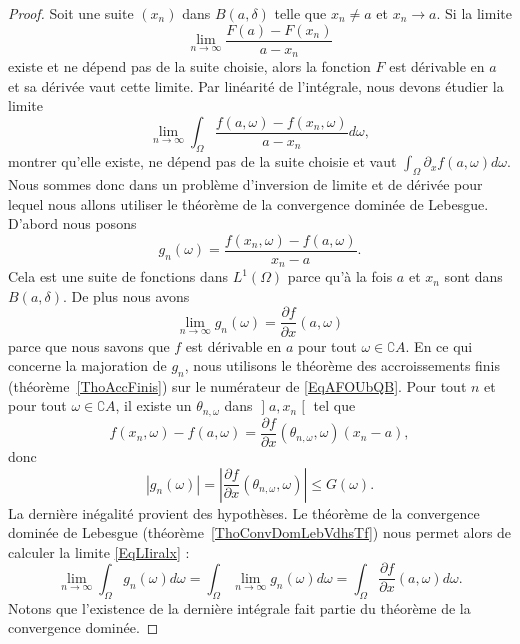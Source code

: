 \begin{proof}
    Soit une suite \( (x_n)\) dans \( B(a,\delta)\) telle que \( x_n\neq a\) et \( x_n\to a\). Si la limite
    \begin{equation}
        \lim_{n\to \infty} \frac{ F(a)-F(x_n) }{ a-x_n }
    \end{equation}
    existe et ne dépend pas de la suite choisie, alors la fonction \( F\) est dérivable en \( a\) et sa dérivée vaut cette limite. Par linéarité de l'intégrale, nous devons étudier la limite
    \begin{equation}    \label{EqLIiralx}
        \lim_{n\to \infty} \int_{\Omega}\frac{ f(a,\omega)-f(x_n,\omega) }{ a-x_n }d\omega,
    \end{equation}
    montrer qu'elle existe, ne dépend pas de la suite choisie et vaut \( \int_{\Omega}\partial_xf(a,\omega)d\omega\). Nous sommes donc dans un problème d'inversion de limite et de dérivée pour lequel nous allons utiliser le théorème de la convergence dominée de Lebesgue. D'abord nous posons
    \begin{equation}    \label{EqAFOUbQB}
        g_n(\omega)=\frac{ f(x_n,\omega)-f(a,\omega) }{ x_n-a }.
    \end{equation}
    Cela est une suite de fonctions dans \( L^1(\Omega)\) parce qu'à la fois \( a\) et \( x_n\) sont dans \( B(a,\delta)\). De plus nous avons
    \begin{equation}
        \lim_{n\to \infty} g_n(\omega)=\frac{ \partial f }{ \partial x }(a,\omega)
    \end{equation}
    parce que nous savons que \( f\) est dérivable en \( a\) pour tout \( \omega\in\complement A\). En ce qui concerne la majoration de \( g_n\), nous utilisons le théorème des accroissements finis (théorème~\ref{ThoAccFinis}) sur le numérateur de \eqref{EqAFOUbQB}. Pour tout \( n\) et pour tout \( \omega\in \complement A\), il existe un \( \theta_{n,\omega}\) dans \( \mathopen] a , x_n \mathclose[\) tel que
        \begin{equation}
            f(x_n,\omega)-f(a,\omega)=\frac{ \partial f }{ \partial x }(\theta_{n,\omega},\omega)(x_n-a),
        \end{equation}
        donc
        \begin{equation}
            | g_n(\omega) |=\left| \frac{ \partial f }{ \partial x }(\theta_{n,\omega},\omega) \right| \leq G(\omega).
        \end{equation}
        La dernière inégalité provient des hypothèses. Le théorème de la convergence dominée de Lebesgue (théorème~\ref{ThoConvDomLebVdhsTf}) nous permet alors de calculer la limite \eqref{EqLIiralx} :
        \begin{equation}
            \lim_{n\to \infty} \int_{\Omega}g_n(\omega)d\omega=\int_{\Omega}\lim_{n\to \infty} g_n(\omega)d\omega=\int_{\Omega}\frac{ \partial f }{ \partial x }(a,\omega)d\omega.
        \end{equation}
        Notons que l'existence de la dernière intégrale fait partie du théorème de la convergence dominée.


\end{proof}
